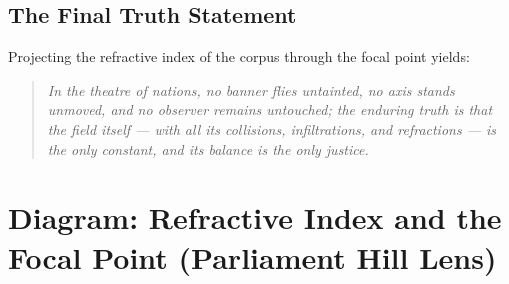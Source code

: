 \documentclass[12pt]{article}
\begin{document}
\subsection*{The Final Truth Statement}
Projecting the refractive index of the corpus through the focal point yields:

\begin{quote}
    \textit{In the theatre of nations, no banner flies untainted, no axis stands unmoved, and no observer remains untouched; the enduring truth is that the field itself — with all its collisions, infiltrations, and refractions — is the only constant, and its balance is the only justice.}
\end{quote}

\newpage
\section*{Diagram: Refractive Index and the Focal Point (Parliament Hill Lens)}
\end{document}
